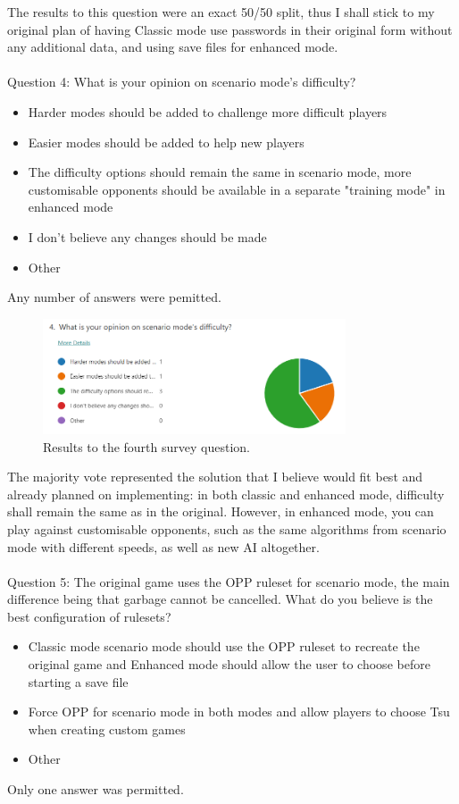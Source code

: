 \documentclass{report}
\begin{document}
The results to this question were an exact 50/50 split, thus I shall stick to my original plan of having Classic mode use passwords in their original form without any additional data, and using save files for enhanced mode.
\\\\
Question 4: What is your opinion on scenario mode's difficulty?
\begin{itemize}
    \renewcommand\labelitemi{--}
    \item Harder modes should be added to challenge more difficult players
    \item Easier modes should be added to help new players
    \item The difficulty options should remain the same in scenario mode, more customisable opponents should be available in a separate "training mode" in enhanced mode
    \item I don't believe any changes should be made
    \item Other
\end{itemize}
Any number of answers were pemitted.

\begin{figure}[ht]
    \centering
    \includegraphics[width=0.8\textwidth]{survey4.png}
    \caption{\label{fig:survey4}Results to the fourth survey question.}
\end{figure}

The majority vote represented the solution that I believe would fit best and already planned on implementing: in both classic and enhanced mode, difficulty shall remain the same as in the original. However, in enhanced mode, you can play against customisable opponents, such as the same algorithms from scenario mode with different speeds, as well as new AI altogether.
\\\\
Question 5: The original game uses the OPP ruleset for scenario mode, the main difference being that garbage cannot be cancelled. What do you believe is the best configuration of rulesets?
\begin{itemize}
    \renewcommand\labelitemi{--}
    \item Classic mode scenario mode should use the OPP ruleset to recreate the original game and Enhanced mode should allow the user to choose before starting a save file
    \item Force OPP for scenario mode in both modes and allow players to choose Tsu when creating custom games
    \item Other
\end{itemize}
Only one answer was permitted.
\end{document}
